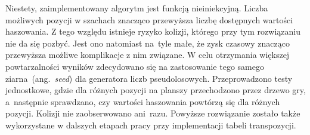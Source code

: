 Niestety, zaimplementowany algorytm jest funkcją nieiniekcyjną.
Liczba możliwych pozycji w szachach znacząco przewyższa liczbę dostępnych wartości haszowania.
Z tego względu istnieje ryzyko kolizji, którego przy tym rozwiązaniu nie da się pozbyć.
Jest ono natomiast na~tyle małe, że zysk czasowy znacząco przewyższa możliwe komplikacje z nim związane.
W celu otrzymania większej powtarzalności wyników zdecydowano się na zastosowanie tego samego ziarna~(ang.~\emph{seed}) dla generatora liczb pseudolosowych.
Przeprowadzono testy jednostkowe, gdzie dla różnych pozycji na planszy przechodzono przez drzewo gry, a~następnie sprawdzano, czy wartości haszowania powtórzą się dla różnych pozycji.
Kolizji nie zaobserwowano ani~razu.
Powyższe rozwiązanie zostało także wykorzystane w dalszych etapach pracy przy implementacji tabeli transpozycji.



